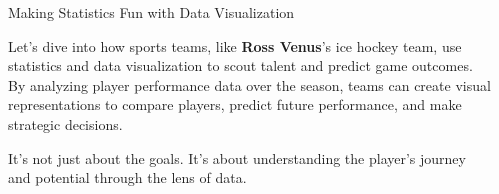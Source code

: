 \documentclass[final]{beamer}
\begin{document}
\begin{frame}[t]{}
\begin{columns}[t]
\begin{column}{.33\textwidth}
		\end{column}

		\begin{column}{.3\textwidth}

			\begin{block}{Making Statistics Fun with Data Visualization}

				\vspace{0.5cm}

				Let's dive into how sports teams, like \textbf{Ross Venus}'s ice hockey team, use statistics and data visualization to scout talent and predict game outcomes. By analyzing player performance data over the season, teams can create visual representations to compare players, predict future performance, and make strategic decisions.

				\vspace{0.5cm}

				It's not just about the goals. It's about understanding the player's journey and potential through the lens of data.

				\vspace{1cm}

				\begin{figure}[htbp]
					
					\centering
					

\end{figure}
\end{block}
\end{column}
\end{columns}
\end{frame}
\end{document}
